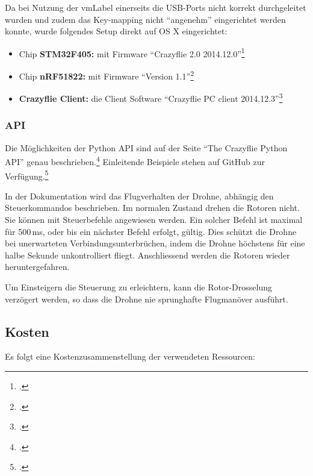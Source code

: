 Da bei Nutzung der \gls{vmLabel} einerseits die USB-Ports nicht korrekt durchgeleitet wurden und zudem das Key-mapping nicht "`angenehm"' eingerichtet werden konnte, wurde folgendes Setup direkt auf OS X eingerichtet:
\begin{itemize}
	\item Chip \textbf{STM32F405:} mit Firmware "`Crazyflie 2.0 2014.12.0"'\footcite{bitcraze_crazyflie-firmware_2015-03-30}
	\item Chip \textbf{nRF51822:} mit Firmware "`Version 1.1"'\footcite{bitcraze_crazyflie2-nrf-firmware_2015-03-30}
	\item \textbf{Crazyflie Client:} die Client Software "`Crazyflie PC client 2014.12.3"'\footcite{bitcraze_crazyflie-clients-python_2015-03-30}
\end{itemize}


\subsubsection{API}
\label{subsubsec:droneApi}
Die Möglichkeiten der Python API sind auf der Seite "`The Crazyflie Python API"' genau beschrieben.\footcite{doc_crazyflie_api_python_index_Bitcraze_Wiki_2015-03-30}
Einleitende Beispiele stehen auf GitHub zur Verfügung.\footcite{crazyflie-clients-python_examples_crazyflie-clients-python_2015-03-30}

In der Dokumentation wird das Flugverhalten der Drohne, abhängig den Steuerkommandos beschrieben.
Im normalen Zustand drehen die Rotoren nicht.
Sie können mit Steuerbefehle angewiesen werden.
Ein solcher Befehl ist maximal für 500\,ms, oder bis ein nächster Befehl erfolgt, gültig.
Dies schützt die Drohne bei unerwarteten Verbindungsunterbrüchen, indem die Drohne höchstens für eine halbe Sekunde unkontrolliert fliegt.
Anschliessend werden die Rotoren wieder heruntergefahren.

Um Einsteigern die Steuerung zu erleichtern, kann die Rotor-Drosselung verzögert werden, so dass die Drohne nie sprunghafte Flugmanöver ausführt.

\newpage
\subsection{Kosten}
Es folgt eine Kostenzusammenstellung der verwendeten Ressourcen:

